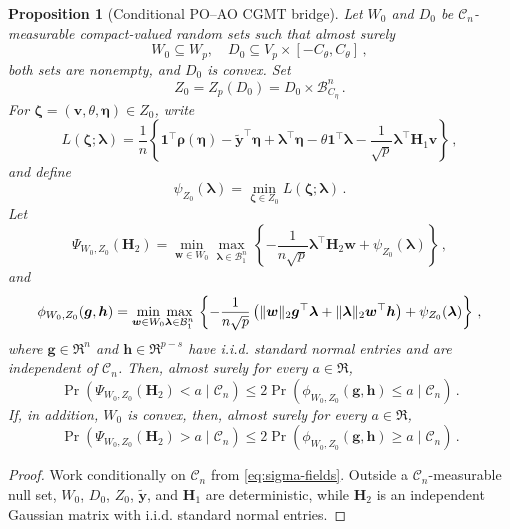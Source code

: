 \documentclass{article}
\makeatletter
\newtheorem{proposition}[theorem]{Proposition}
\theoremstyle{definition}
\newcommand{\vnorm}[1]{%
	\ensuremath{%
		\if@display
		\left\| #1 \right\|
		\else
		\| #1 \|
		\fi
	}%
}
\newcommand*{\bb}{\boldsymbol}
\def\bw {\bb{w}}
\def\bH {\bb{H}}
\def\bv{\bb{v}}
\def\bh{\bb{h}}
\def\bg{\bb{g}}
\def\bYtil{\widetilde{\bb{y}}}
\def\bH{\bb{H}}
\def\blambda{\bb{\lambda}}
\makeatother
\begin{document}
\begin{bibunit}
\begin{proposition}[Conditional PO--AO CGMT bridge]
	\label{thm:pathwise_cgmt_localisation}
	Let $W_0$ and $D_0$ be $\mathcal C_n$-measurable compact-valued
	random sets such that almost surely
	$$
		W_0\subseteq W_p,
		\quad
		D_0\subseteq V_p\times[-C_\theta,C_\theta] \,,
	$$
	both sets are nonempty, and $D_0$ is convex. Set
	$$
		Z_0
		=
		Z_p(D_0)
		=
		D_0
		\times
		\mathcal B^n_{C_\eta} \,.
	$$
	For $\bb\zeta=(\bv,\theta,\bb\eta)\in Z_0$, write
	$$
		L(\bb\zeta;\blambda)
		=
		\frac1n
		\left\{
			\bb1^\top\bb\rho(\bb\eta)
			-\bYtil^\top\bb\eta
			+\blambda^\top\bb\eta
			-\theta\bb1^\top\blambda
			-\frac{1}{\sqrt p}\blambda^\top\bH_1\bv
		\right\} \,,
	$$
	and define
	$$
		\psi_{Z_0}(\blambda)
		=
		\underset{\bb\zeta\in Z_0}{\min}
		L(\bb\zeta;\blambda) \,.
	$$
	Let
	$$
		\Psi_{W_0,Z_0}(\bb H_2)
		=
		\underset{\bw\in W_0}{\min}
		\underset{\blambda\in\mathcal B^n_1}{\max} \,
		\left\{
			-\frac{1}{n\sqrt p}\blambda^\top\bH_2\bw
			+
			\psi_{Z_0}(\blambda)
		\right\} \,, 
	$$
	and
	\begin{equation}
		\label{eq:ao_scalarisation_start}
		\phi_{W_0,Z_0}(\bg,\bh)
		=
		\underset{\bw\in W_0}{\min}
		\underset{\blambda\in\mathcal B^n_1}{\max} \,
		\left\{
			-\frac{1}{n\sqrt p}
			\left(
				\vnorm{\bw}_2\bg^\top\blambda
				+
				\vnorm{\blambda}_2\bw^\top\bh
			\right)
			+
			\psi_{Z_0}(\blambda)
		\right\}\,,
	\end{equation}
	where $\bg\in\Re^n$ and $\bh\in\Re^{p-s}$ have i.i.d. standard normal
	entries and are independent of $\mathcal C_n$. Then, almost surely for every
	$a\in\Re$, 
	$$
		\Pr\left(\Psi_{W_0,Z_0}(\bH_2)<a \mid \mathcal C_n\right)
		\leq
		2\Pr\left(\phi_{W_0,Z_0}(\bg,\bh)\leq a \mid \mathcal C_n\right)\,.
	$$
	If, in addition, $W_0$ is convex, then, almost
	surely for every $a\in\Re$, 
	$$
		\Pr\left(\Psi_{W_0,Z_0}(\bH_2)>a \mid \mathcal C_n\right)
		\leq
		2\Pr\left(\phi_{W_0,Z_0}(\bg,\bh)\geq a \mid \mathcal C_n\right)\,.
	$$
\end{proposition}

\begin{proof}
	Work conditionally on $\mathcal C_n$ from \eqref{eq:sigma-fields}.
	Outside a $\mathcal C_n$-measurable null set, $W_0$, $D_0$, $Z_0$,
	$\bYtil$, and $\bH_1$ are deterministic, while $\bH_2$ is an
	independent Gaussian matrix with i.i.d. standard normal entries.


\end{proof}
\end{bibunit}
\end{document}
